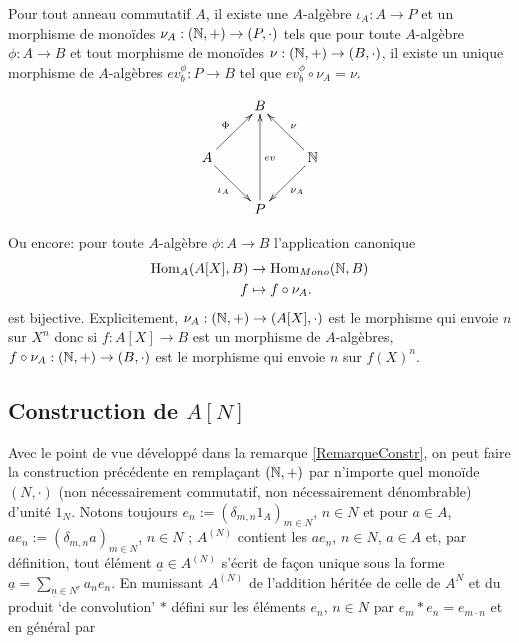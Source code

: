   \begin{lemme}Pour tout anneau commutatif $A$, il existe une $A$-algèbre $\iota_A: A\rightarrow P$ et un morphisme de monoïdes $\nu_A:(\mathbb{N},+)\rightarrow (P,\cdot)$ tels que pour toute $A$-algèbre $\phi: A\rightarrow B$ et tout morphisme de monoïdes $\nu:(\mathbb{N},+)\rightarrow (B,\cdot)$, il existe un unique  morphisme de $A$-algèbres $ev^\phi_b:P\rightarrow B$  tel que $ ev^\phi_b\circ \nu_A=\nu$.\end{lemme}

  $$ \xymatrix{ & B \\ A \ar[ru]^\Phi \ar[rd]_{\iota_A} & & \mathbb{N} \ar[lu]_\nu \ar[ld]^{\nu_A} \\ & P \ar[uu]_{ev} } $$

 Ou encore: pour toute $A$-algèbre $\phi:A\rightarrow B$  l'application canonique
\begin{align}\operatorname{Hom}_A(A[X],B) &\to \operatorname{Hom}_{Mono}(\mathbb{N},B) \\ f &\mapsto f\circ \nu_A.\end{align}
 est bijective. Explicitement, $\nu_A:(\mathbb{N},+)\rightarrow (A[X],\cdot)$ est le morphisme qui envoie $n$ sur $X^n$ donc si $f:A[X]\rightarrow B$ est un morphisme de $A$-algèbres, $f\circ \nu_A:(\mathbb{N},+)\rightarrow (B,\cdot)$  est le morphisme qui envoie $n$ sur $f(X)^n$.\\

 \subsection{Construction de $A[N]$}

  Avec le point de vue développé dans la remarque \ref{RemarqueConstr}, on peut faire la construction précédente en remplaçant $(\mathbb{N},+)$ par n'importe quel monoïde $(N,\cdot)$ (non nécessairement commutatif, non nécessairement dénombrable) d'unité $1_N$.   Notons toujours $e_{n}:=(\delta_{m,n}1_{A})_{m\in N}$, $n\in N$ et pour $a\in A$, $ae_{n}:=(\delta_{m,n}a)_{m\in  N}$, $n\in N$ ; $A^{(N)}$ contient les $ae_{n}$, $n\in N$, $a\in A$ et, par définition,  tout élément $\underline{a}\in A^{(N)}$ s'écrit de façon unique sous la forme $\underline{a}=\sum_{\underline{n}\in N^r}a_ne_{n}$. En munissant $A^{(N)}$ de l'addition héritée de celle de $A^{N}$ et du produit `de convolution' $*$ défini sur les éléments $e_{n}$, $n\in N$ par
$e_{m}*e_{n}=e_{m\cdot n} $ et en général par

